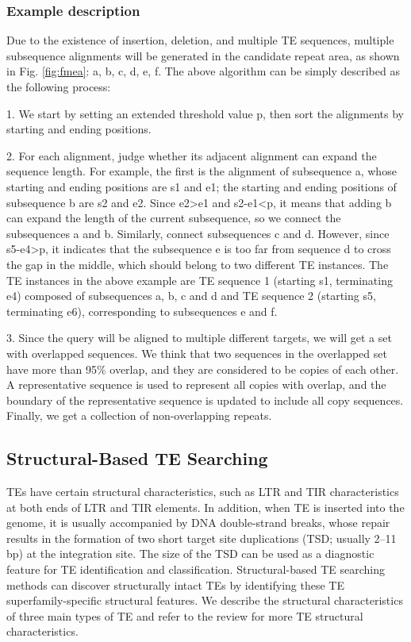 \documentclass{bmcart}
\begin{document}
\subsubsection*{Example description}
Due to the existence of insertion, deletion, and multiple TE sequences, multiple subsequence alignments will be generated in the candidate repeat area, as shown in Fig. \ref{fig:fmea}: a, b, c, d, e, f. The above algorithm can be simply described as the following process:

1. We start by setting an extended threshold value p, then sort the alignments by starting and ending positions.

2. For each alignment, judge whether its adjacent alignment can expand the sequence length. For example, the first is the alignment of subsequence a, whose starting and ending positions are s1 and e1; the starting and ending positions of subsequence b are s2 and e2. Since e2>e1 and s2-e1<p, it means that adding b can expand the length of the current subsequence, so we connect the subsequences a and b. Similarly, connect subsequences c and d. However, since s5-e4>p, it indicates that the subsequence e is too far from sequence d to cross the gap in the middle, which should belong to two different TE instances. The TE instances in the above example are TE sequence 1 (starting s1, terminating e4) composed of subsequences a, b, c and d and TE sequence 2 (starting s5, terminating e6), corresponding to subsequences e and f.

3. Since the query will be aligned to multiple different targets, we will get a set with overlapped sequences. We think that two sequences in the overlapped set have more than 95\% overlap, and they are considered to be copies of each other. A representative sequence is used to represent all copies with overlap, and the boundary of the representative sequence is updated to include all copy sequences. Finally, we get a collection of non-overlapping repeats.

\subsection*{Structural-Based TE Searching}
TEs have certain structural characteristics, such as LTR and TIR characteristics at both ends of LTR and TIR elements. In addition, when TE is inserted into the genome, it is usually accompanied by DNA double-strand breaks, whose repair results in the formation of two short target site duplications (TSD; usually 2–11 bp) at the integration site. The size of the TSD can be used as a diagnostic feature for TE identification and classification. Structural-based TE searching methods can discover structurally intact TEs by identifying these TE superfamily-specific structural features. We describe the structural characteristics of three main types of TE and refer to the review for more TE structural characteristics\cite{wicker2007unified}.
\end{document}
